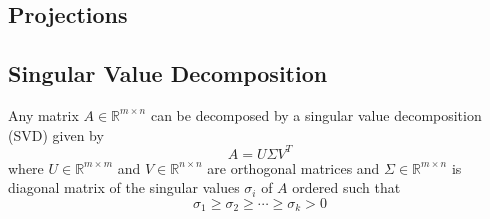 \subsection{Projections}


\subsection{Singular Value Decomposition}
Any matrix $A \in \mathbb{R}^{m\times n}$ can be decomposed by a singular value decomposition (SVD) given by
\begin{equation*}
A = U\Sigma V^T
\end{equation*}
where $U \in \mathbb{R}^{m\times m}$ and $V \in \mathbb{R}^{n\times n}$ are orthogonal matrices and $\Sigma \in \mathbb{R}^{m\times n}$ is diagonal matrix of the singular values $\sigma_i$ of $A$ ordered such that
\begin{equation*}
\sigma_1 \geq \sigma_2 \geq \cdots \geq \sigma_k > 0
\end{equation*}


